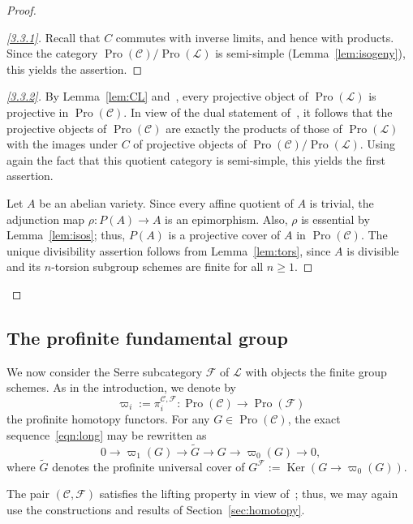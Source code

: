 \documentclass[11pt]{article}
\theoremstyle{definition}
\newenvironment{proofc}{\begin{proof}}{\end{proof}}
\numberwithin{equation}{section}
\newcommand\cC{{\mathcal C}}
\newcommand\cF{{\mathcal F}}
\newcommand\cL{{\mathcal L}}
\newcommand\tG{{\widetilde G}}
\DeclareMathOperator{\Ker}{Ker}
\DeclareMathOperator{\Pro}{Pro}
\newenvironment{step}[1]{\begin{proof}[#1]}{\let\qed\relax\end{proof}}
\newenvironment{laststep}[1]{\begin{proof}[#1]}{\end{proof}}
\renewenvironment{proofc}{\begin{proof}}{\end{proof}}
\theoremstyle{remark}
\begin{document}
\begin{proofc}
\begin{step}{\eqref{3.3.1}}%
Recall that $C$ commutes with inverse limits, and hence with products. Since the category $\Pro(\cC)/\Pro(\cL)$ is semi-simple (Lemma~\ref{lem:isogeny}), this yields the assertion.
\end{step}

\begin{laststep}{\eqref{3.3.2}}
By Lemma~\ref{lem:CL} and~\cite[Lem.~2.14]{Br17b}, every projective object of $\Pro(\cL)$ is projective in $\Pro(\cC)$. In view of the dual statement of~\cite[III.3.Cor.~2]{Gabriel}, it follows that the projective objects of $\Pro(\cC)$ are exactly the products of those of $\Pro(\cL)$ with the images under $C$ of projective objects of $\Pro(\cC)/\Pro(\cL)$. Using again the fact that this quotient category is semi-simple, this yields the first assertion.

Let $A$ be an abelian variety. Since every affine quotient of $A$ is trivial, the adjunction map $\rho : P(A) \to A$ is an epimorphism. Also, $\rho$ is essential by Lemma~\ref{lem:isos}; thus, $P(A)$ is a projective cover of $A$ in $\Pro(\cC)$. The unique divisibility assertion follows from Lemma~\ref{lem:tors}, since $A$ is divisible and its $n$-torsion subgroup schemes are finite for all $n \geq 1$.
\end{laststep}
\let\qed\relax
\end{proofc}

\subsection{The profinite fundamental group}\label{subsec:profinite}

We now consider the Serre subcategory $\cF$ of $\cL$ with objects the finite group schemes. As in the introduction, we denote by
\[
\varpi_i := \pi_i^{\cC,\cF} : \Pro(\cC) \longrightarrow \Pro(\cF)
\]
the profinite homotopy functors. For any $G \in \Pro(\cC)$, the exact sequence~\eqref{eqn:long} may be rewritten as
\[
0 \longrightarrow \varpi_1(G) \longrightarrow \tG
\longrightarrow G \longrightarrow \varpi_0(G)
\longrightarrow 0,
\]
where $\tG$ denotes the profinite universal cover of $G^{\cF} := \Ker(G \to \varpi_0(G))$.

The pair $(\cC,\cF)$ satisfies the lifting property in view of~\cite[Thm.~1.1]{Br15}; thus, we may again use the constructions and results of Section~\ref{sec:homotopy}.
\end{document}
